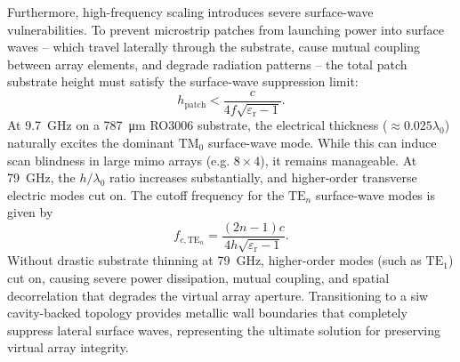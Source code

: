 Furthermore, high-frequency scaling introduces severe surface-wave vulnerabilities.
To prevent microstrip patches from launching power into surface waves -- which travel laterally through the substrate, cause mutual coupling between array elements, and degrade radiation patterns -- the total patch substrate height must satisfy the surface-wave suppression limit:
\begin{equation}
    \label{eq:surface-wave-limit}
    h_{\text{patch}} < \frac{c}{4 f \sqrt{\varepsilon_{\mathrm{r}} - 1}}.
\end{equation}
At \qty{9.7}{\giga\hertz} on a \qty{787}{\micro\metre} RO3006 substrate, the electrical thickness ($\approx 0.025\lambda_{0}$) naturally excites the dominant $\text{TM}_{0}$ surface-wave mode.
While this can induce scan blindness in large \gls{mimo} arrays (e.g. $8 \times 4$), it remains manageable.
At \qty{79}{\giga\hertz}, the $h/\lambda_{0}$ ratio increases substantially, and higher-order transverse electric modes cut on.
The cutoff frequency for the $\text{TE}_{n}$ surface-wave modes is given by
\begin{equation}
    \label{eq:te-cutoff}
    f_{c,\text{TE}_n} = \frac{(2n-1)c}{4h\sqrt{\varepsilon_{\mathrm{r}} - 1}}.
\end{equation}
Without drastic substrate thinning at \qty{79}{\giga\hertz}, higher-order modes (such as $\text{TE}_{1}$) cut on, causing severe power dissipation, mutual coupling, and spatial decorrelation that degrades the virtual array aperture.
Transitioning to a \gls{siw} cavity-backed topology provides metallic wall boundaries that completely suppress lateral surface waves, representing the ultimate solution for preserving virtual array integrity.

